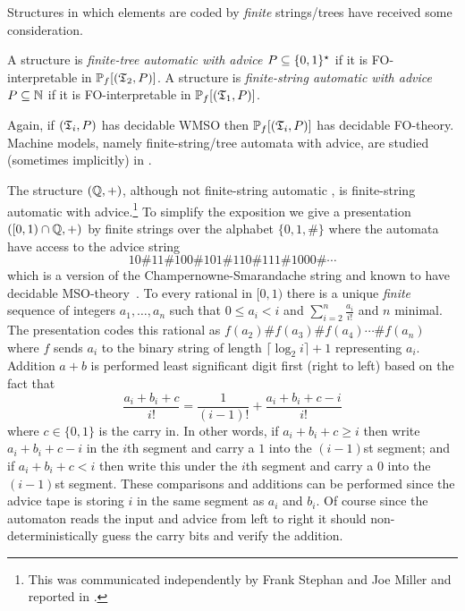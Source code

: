 Structures in which elements are coded by {\em finite} strings/trees have received some consideration. 

\begin{definition} 
A structure is  {\em finite-tree automatic with advice $P \subseteq \{0,1\}^\star$} if it is FO-interpretable in ${\mathbb P}_f[(\mathfrak{T}_2,P)]$.
A structure is  {\em finite-string automatic with advice $P \subseteq \mathbb{N}$}  if it is FO-interpretable in ${\mathbb P}_f[(\mathfrak{T}_1,P)]$.
\end{definition}

Again, if $(\mathfrak{T}_i,P)$ has decidable WMSO then ${\mathbb P}_f[(\mathfrak{T}_i,P)]$ has decidable FO-theory. Machine models, namely finite-string/tree automata with advice, are studied (sometimes implicitly) in \cite{ElRa66,CaTh02,RaTh06,Bara06Hierarchy,CoLo07,KRSZ12,Fratani12}. 



\begin{example} The structure $(\mathbb{Q},+)$, although not finite-string automatic \cite{Tsan11}, is finite-string automatic with 
advice.\footnote{This was communicated independently by Frank Stephan and Joe Miller and reported in \cite{Nies07}.}
To simplify the exposition we give a presentation $([0,1) \cap \mathbb{Q},+)$ by finite strings
over the alphabet $\{0,1,\#\}$ where the automata have access to the advice string
\[
10\#11\#100\#101\#110\#111\#1000\#\cdots
\]
which is a version of the Champernowne-Smarandache string and known to have decidable MSO-theory~\cite{Bara07}. 
To every rational in $[0,1)$ there is a unique {\em finite}
sequence of integers  $a_1, \dots, a_n$ such that $0 \leq a_i < i$ 
and $\sum_{i=2}^n \frac{a_i}{i!}$ and $n$ minimal. The presentation codes this rational as
$f(a_2)\#f(a_3)\#f(a_4) \cdots \#f(a_n)$ where $f$ sends $a_i$ to the binary string of length $\lceil  \log_2 i \rceil +1$  representing $a_i$. Addition $a+b$ is performed least significant digit first (right to left) based on the fact that 
\[
\frac{a_i + b_i + c}{i!} = \frac{1}{(i-1)!} + \frac{a_i + b_i + c - i}{i!}
\]
where $c \in \{0,1\}$ is the carry in. In other words, if $a_i+b_i+c \geq i$ then write $a_i+b_i+c-i$ in the $i$th segment and carry a $1$ into the $(i-1)$st segment; and if $a_i +b_i + c < i$ then write this under the $i$th segment and carry a $0$ into the $(i-1)$st segment.  These comparisons and additions can be performed since the advice tape is storing $i$ in the same segment as $a_i$ and $b_i$. Of course since the automaton reads the input and advice from left to right it should non-deterministically guess the carry bits and verify the addition.
\end{example}

